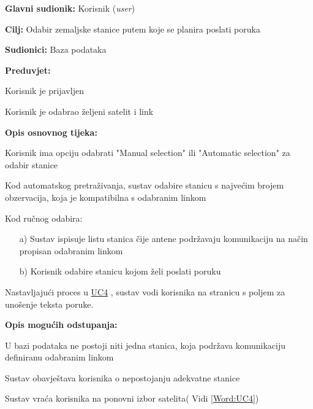 			\begin{packed_item}
				
				\item \textbf{Glavni sudionik: }Korisnik (\textit{user})
				\item  \textbf{Cilj: }Odabir zemaljske stanice putem koje se planira poslati poruka
				\item  \textbf{Sudionici: }Baza podataka
				\item  \textbf{Preduvjet: }
				\begin{packed_enum}
					\item Korisnik je prijavljen \item Korisnik je odabrao željeni satelit i link\end{packed_enum}
				\item  \textbf{Opis osnovnog tijeka: }
				
				\item[] \begin{packed_enum}
					
					\item Korisnik ima opciju odabrati "Manual selection" ili "Automatic selection" za odabir stanice
					\item Kod automatskog pretraživanja, sustav odabire stanicu s najvećim brojem obzervacija, koja je kompatibilna s odabranim linkom
					\item Kod ručnog odabira:\begin{itemize}
						\item[a)] Sustav ispisuje listu stanica čije antene podržavaju komunikaciju na način propisan odabranim linkom
						\item[b)] Korisnik odabire stanicu kojom želi poslati poruku
					\end{itemize} 
					\item Nastavljajući proces u \hyperref[Word:generiranjem poruke kao što je opisano u UC4]{UC4} , sustav vodi korisnika na stranicu s poljem za unošenje teksta poruke.
					
				\end{packed_enum}
				
				\item  \textbf{Opis mogućih odstupanja: }
				
				\item[] \begin{packed_item}
				
					\item[1] U bazi podataka ne postoji niti jedna stanica, koja podržava komunikaciju definiranu odabranim linkom
					\item[ ] \begin{packed_enum}
						
						\item[1.1] Sustav obavještava korisnika o nepostojanju adekvatne stanice
						\item[1.2] Sustav vraća korisnika na ponovni izbor satelita( Vidi \ref{Word:UC4})
					\end{packed_enum}
								
					
				\end{packed_item}
			\end{packed_item}
